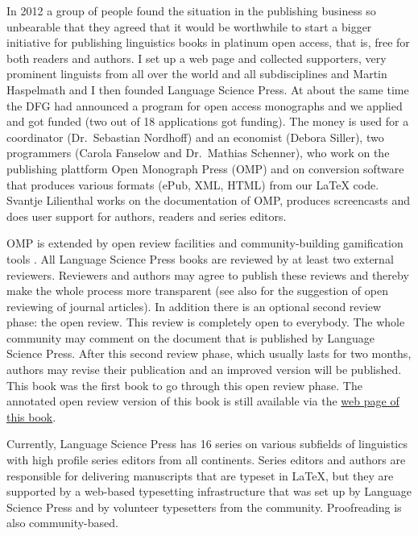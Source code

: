 In 2012 a group of people found the situation in the publishing business so unbearable that they
agreed that it would be worthwhile to start a bigger initiative for publishing linguistics books in
platinum open access, that is, free for both readers and authors. I set up a web page and collected
supporters, very prominent linguists from all over the world and all subdisciplines and Martin
Haspelmath and I then founded Language Science Press. At about the same time the DFG had announced
a program for open access monographs and we applied \citep{MH2013a} and got funded (two out of 18 applications got
funding). The money is used for a coordinator (Dr.\ Sebastian Nordhoff) and an economist (Debora
Siller), two programmers (Carola Fanselow and Dr.\ Mathias Schenner), who work on the publishing
plattform Open Monograph Press (OMP) and on conversion software that produces various formats (ePub, XML,
HTML) from our \LaTeX{} code. Svantje Lilienthal works on the documentation of OMP, produces
screencasts and does user support for authors, readers and series editors.

OMP is extended by open review facilities and community-building gamification tools
\citep{MuellerOA,MH2013a}. All Language Science Press books are reviewed by at least two external
reviewers. Reviewers and authors may agree to publish these reviews and thereby make the whole
process more transparent (see also  for the suggestion of open reviewing of journal
articles). In addition there is an optional second review phase: the open
review. This review is completely open to everybody. The whole community may comment on the document
that is published by Language Science Press. After this second review phase, which usually lasts for
two months, authors may revise their publication and an improved version will be published. This
book was the first book to go through this open review phase. The annotated open review version of this book is still available via
the \href{\lsURL}{web page of this book}. 

Currently, Language Science Press has 16 series on various subfields of linguistics with high
profile series editors from all continents. Series editors  and authors are responsible for
delivering manuscripts that are typeset in \LaTeX{}, but they are supported by a web-based typesetting
infrastructure that was set up by Language Science Press and by volunteer typesetters from the
community. Proofreading is also community-based.

